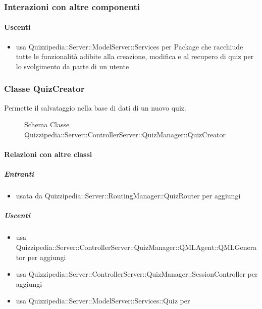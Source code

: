\subsubsection{Interazioni con altre componenti}
\paragraph{Uscenti}
\begin{itemize}
\item usa Quizzipedia::Server::ModelServer::Services per Package che racchiude tutte le funzionalità adibite alla creazione, modifica e al recupero di quiz per lo svolgimento da parte di un utente
\end{itemize}
\subsubsection{Classe QuizCreator}
Permette il salvataggio nella base di dati di un nuovo quiz.
\begin{figure}[H]
\centering
\noindent{}
\caption[Schema Classe QuizCreator]{Schema Classe Quizzipedia::Server::ControllerServer::QuizManager::QuizCreator}
\end{figure}
\paragraph{Relazioni con altre classi}
\subparagraph{Entranti}
\begin{itemize}
\item usata da Quizzipedia::Server::RoutingManager::QuizRouter per aggiungi
\end{itemize}
\subparagraph{Uscenti}
\begin{itemize}
\item usa Quizzipedia::Server::ControllerServer::QuizManager::QMLAgent::QMLGenerator per aggiungi
\item usa Quizzipedia::Server::ControllerServer::QuizManager::SessionController per aggiungi
\item usa Quizzipedia::Server::ModelServer::Services::Quiz per 
\end{itemize}
